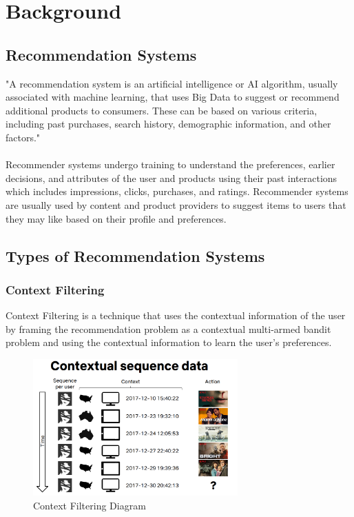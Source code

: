 \chapter{Background}
\minitoc

\section{Recommendation Systems}\label{sec:recommendation-systems}
"A recommendation system is an artificial intelligence or AI algorithm, usually associated with machine learning, that uses Big Data to suggest or recommend additional products to consumers. These can be based on various criteria, including past purchases, search history, demographic information, and other factors." \cite{NvidiaRecSys} \\ \\
Recommender systems undergo training to understand the preferences, earlier decisions, and attributes of the user and products using their past interactions which includes impressions, clicks, purchases, and ratings. Recommender systems are usually used by content and product providers to suggest items to users that they may like based on their profile and preferences. 

\section{Types of Recommendation Systems}\label{sec:types-of-recommendation-systems}

\subsection{Context Filtering}
Context Filtering is a technique that uses the contextual information of the user by framing the recommendation problem as a contextual multi-armed bandit problem and using the contextual information to learn the user's preferences.
\begin{figure}[H]
    \centering
    \includegraphics[width=0.7\textwidth]{assets/contextual-sequence-prediction.png}
    \caption[Context Filtering Diagram]{Context Filtering Diagram \cite{NvidiaRecSys}} 
\end{figure}
